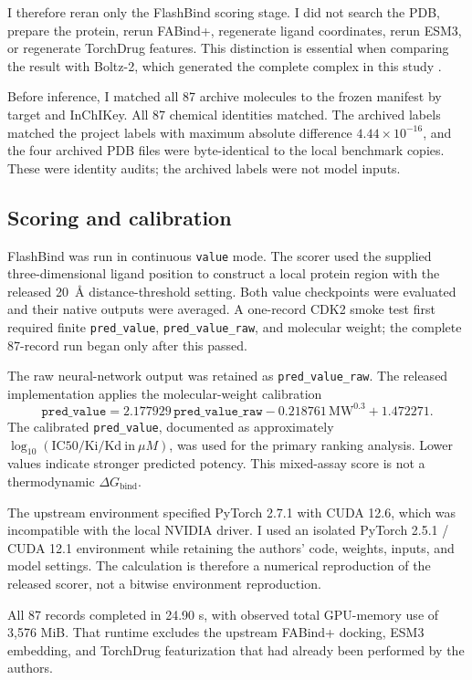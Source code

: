 \documentclass[11pt]{article}
\begin{document}
I therefore reran only the FlashBind scoring stage. I did not search the PDB,
prepare the protein, rerun FABind+, regenerate ligand coordinates, rerun ESM3,
or regenerate TorchDrug features. This distinction is essential when comparing
the result with Boltz-2, which generated the complete complex in this study
\citep{jiang2026flashbind}.

Before inference, I matched all 87 archive molecules to the frozen manifest by
target and InChIKey. All 87 chemical identities matched. The archived labels
matched the project labels with maximum absolute difference
$4.44\times10^{-16}$, and the four archived PDB files were byte-identical to
the local benchmark copies. These were identity audits; the archived labels
were not model inputs.

\subsection{Scoring and calibration}

FlashBind was run in continuous \texttt{value} mode. The scorer used the
supplied three-dimensional ligand position to construct a local protein region
with the released 20~\AA{} distance-threshold setting. Both value checkpoints
were evaluated and their native outputs were averaged. A one-record CDK2 smoke
test first required finite \texttt{pred\_value}, \texttt{pred\_value\_raw},
and molecular weight; the complete 87-record run began only after this passed.

The raw neural-network output was retained as \texttt{pred\_value\_raw}. The
released implementation applies the molecular-weight calibration
\[
 \texttt{pred\_value}
 =2.177929\,\texttt{pred\_value\_raw}
 -0.218761\,\mathrm{MW}^{0.3}+1.472271.
\]
The calibrated \texttt{pred\_value}, documented as approximately
$\log_{10}(\mathrm{IC50}/\mathrm{Ki}/\mathrm{Kd}\ \mathrm{in}\ \mu M)$,
was used for the primary ranking analysis. Lower values indicate stronger
predicted potency. This mixed-assay score is not a thermodynamic
$\Delta G_{\mathrm{bind}}$.

The upstream environment specified PyTorch 2.7.1 with CUDA 12.6, which was
incompatible with the local NVIDIA driver. I used an isolated PyTorch 2.5.1 /
CUDA 12.1 environment while retaining the authors' code, weights, inputs, and
model settings. The calculation is therefore a numerical reproduction of the
released scorer, not a bitwise environment reproduction.

All 87 records completed in 24.90 s, with observed total GPU-memory use of
3,576 MiB. That runtime excludes the upstream FABind+ docking, ESM3 embedding,
and TorchDrug featurization that had already been performed by the authors.
\end{document}
